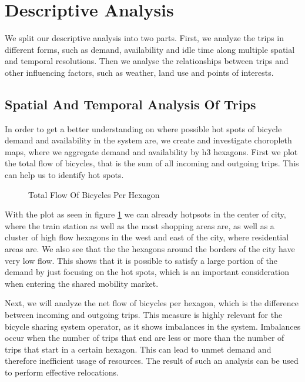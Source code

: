 \section{Descriptive Analysis}
\label{sec:descriptive_analysis}

We split our descriptive analysis into two parts.
First, we analyze the trips in different forms, such as demand, availability and
idle time along multiple spatial and temporal resolutions. Then we analyse the
relationships between trips and other influencing factors, such as weather,
land use and points of interests.


\subsection{Spatial And Temporal Analysis Of Trips}
\label{subsec:descriptive_analysis_spatial_temporal}

In order to get a better understanding on where possible hot spots of bicycle
demand and availability in the system are, we create and investigate choropleth maps,
where we aggregate demand and availability by h3 hexagons.
First we plot the total flow of bicycles, that is the sum of all incoming and
outgoing trips. This can help us to identify hot spots.

\begin{figure}[htb]
    \centering
    \caption{Total Flow Of Bicycles Per Hexagon}
    \label{fig:descriptive_analysis_total_flow}
\end{figure}

With the plot as seen in figure \ref{fig:descriptive_analysis_total_flow} we
can already hotpsots in the center of city, where the train station as well as
the most shopping areas are, as well as a cluster of high flow hexagons in the
west and east of the city, where residential areas are.
We also see that the the hexagons around the borders of the city have very low flow. This shows that it is possible to satisfy a large portion of the demand by just focusing on the hot spots, which is an important consideration when entering the shared mobility market.

Next, we will analyze the net flow of bicycles per hexagon, which is the
difference between incoming and outgoing trips. This measure is highly relevant
for the bicycle sharing system operator, as it shows imbalances in the system.
Imbalances occur when the number of trips that end are less or more than the
number of trips that start in a certain hexagon. This can lead to unmet demand
and therefore inefficient usage of resources. The result of such an analysis
can be used to perform effective relocations.

